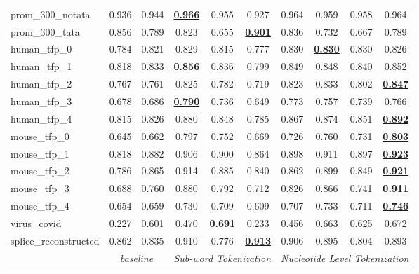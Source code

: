 \begin{table*}[h!]
\begin{center}
\begin{tabular}{l|cc|ccc|cccc}
prom\_300\_notata & 0.936 & 0.944 & {\ul \textbf{0.966}} & 0.955 & 0.927 & 0.964 & 0.959 & 0.958 & 0.964 \\
prom\_300\_tata & 0.856 & 0.789 & 0.823 & 0.655 & {\ul \textbf{0.901}} & 0.836 & 0.732 & 0.667 & 0.789 \\
human\_tfp\_0 & 0.784 & 0.821 & 0.829 & 0.815 & 0.777 & 0.830 & {\ul \textbf{0.830}} & 0.830 & 0.826 \\
human\_tfp\_1 & 0.818 & 0.833 & {\ul \textbf{0.856}} & 0.836 & 0.799 & 0.849 & 0.848 & 0.840 & 0.852 \\
human\_tfp\_2 & 0.767 & 0.761 & 0.825 & 0.782 & 0.719 & 0.823 & 0.833 & 0.802 & {\ul \textbf{0.847}} \\
human\_tfp\_3 & 0.678 & 0.686 & {\ul \textbf{0.790}} & 0.736 & 0.649 & 0.773 & 0.757 & 0.739 & 0.766 \\
human\_tfp\_4 & 0.815 & 0.826 & 0.880 & 0.848 & 0.785 & 0.867 & 0.874 & 0.851 & {\ul \textbf{0.892}} \\
mouse\_tfp\_0 & 0.645 & 0.662 & 0.797 & 0.752 & 0.669 & 0.726 & 0.760 & 0.731 & {\ul \textbf{0.803}} \\
mouse\_tfp\_1 & 0.818 & 0.882 & 0.906 & 0.900 & 0.864 & 0.898 & 0.911 & 0.897 & {\ul \textbf{0.923}} \\
mouse\_tfp\_2 & 0.786 & 0.865 & 0.914 & 0.885 & 0.840 & 0.862 & 0.899 & 0.849 & {\ul \textbf{0.921}} \\
mouse\_tfp\_3 & 0.688 & 0.760 & 0.880 & 0.792 & 0.712 & 0.826 & 0.866 & 0.741 & {\ul \textbf{0.911}} \\
mouse\_tfp\_4 & 0.654 & 0.659 & 0.730 & 0.709 & 0.609 & 0.707 & 0.733 & 0.711 & {\ul \textbf{0.746}} \\
virus\_covid & 0.227 & 0.601 & 0.470 & {\ul \textbf{0.691}} & 0.233 & 0.456 & 0.663 & 0.625 & 0.672 \\
splice\_reconstructed & 0.862 & 0.835 & 0.910 & 0.776 & {\ul \textbf{0.913}} & 0.906 & 0.895 & 0.804 & 0.893 \\
\hline
\multicolumn{1}{l|}{} & \multicolumn{2}{c|}{\textit{baseline}} & \multicolumn{3}{c|}{\textit{Sub-word Tokenization}} & \multicolumn{4}{c}{\textit{Nucleotide Level Tokenization}} \\ \hline
\end{tabular}
\end{center}
\end{table*}